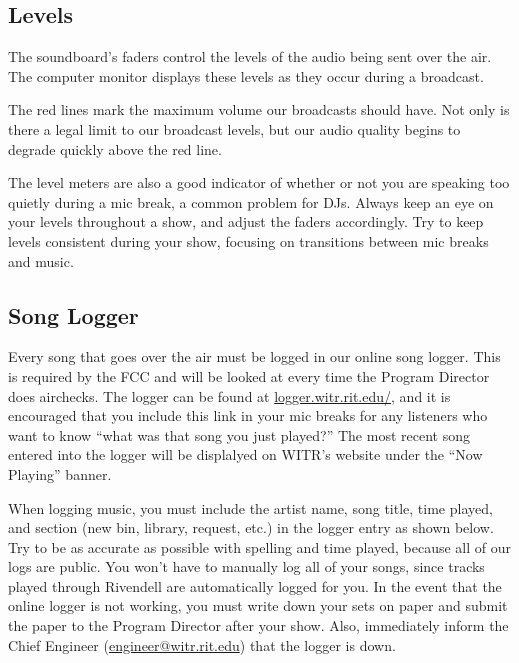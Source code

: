 \documentclass{witrman}
\begin{document}
\subsection{Levels}

The soundboard's faders control the levels of the audio being sent over the air.
The computer monitor displays these levels as they occur during a broadcast.


The red lines mark the maximum volume our broadcasts should have.  Not only is
there a legal limit to our broadcast levels, but our audio quality begins to
degrade quickly above the red line.

The level meters are also a good indicator of whether or not you are speaking
too quietly during a mic break, a common problem for DJs. Always keep an eye on
your levels throughout a show, and adjust the faders accordingly.  Try to keep
levels consistent during your show, focusing on transitions between mic breaks
and music.

\subsection{Song Logger}

Every song that goes over the air must be logged in our online song logger.
This is required by the FCC and will be looked at every time the Program
Director does airchecks.  The logger can be found at
\href{https://logger.witr.rit.edu}{logger.witr.rit.edu/}, and it is encouraged
that you include this link in your mic breaks for any listeners who want to know
``what was that song you just played?''  The most recent song entered into the
logger will be displalyed on WITR's website under the ``Now Playing'' banner.


When logging music, you must include the artist name, song title, time played,
and section (new bin, library, request, etc.) in the logger entry as shown
below.  Try to be as accurate as possible with spelling and time played, because
all of our logs are public.  You won't have to manually log all of your songs,
since tracks played through Rivendell are automatically logged for you.  In the
event that the online logger is not working, you must write down your sets on
paper and submit the paper to the Program Director after your show.  Also,
immediately inform the Chief Engineer
(\href{mailto:engineer@witr.rit.edu}{engineer@witr.rit.edu}) that the logger is
down.
\end{document}
